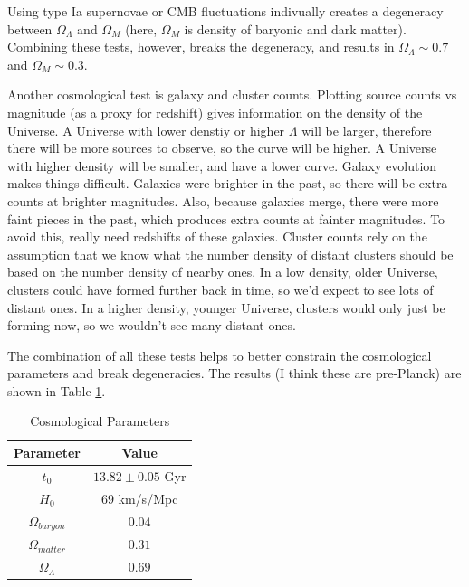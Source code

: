 Using type Ia supernovae or CMB fluctuations indivually creates a degeneracy 
between $\Omega_{\Lambda}$ and $\Omega_M$ (here, $\Omega_M$ is density of 
baryonic and dark matter).  Combining these tests, however, breaks the 
degeneracy, and results in $\Omega_{\Lambda}\sim0.7$ and $\Omega_M\sim0.3$.

Another cosmological test is galaxy and cluster counts.  Plotting 
source counts vs magnitude (as a proxy for redshift) gives information 
on the density of the Universe.  A Universe with lower denstiy or higher 
$\Lambda$ will be larger, therefore there will be more sources to observe, 
so the curve will be higher.  A Universe with higher density will be smaller, 
and have a lower curve.  Galaxy evolution makes things difficult.  Galaxies 
were brighter in the past, so there will be extra counts at brighter 
magnitudes.  Also, because galaxies merge, there were more faint pieces in 
the past, which produces extra counts at fainter magnitudes.  To avoid this, 
really need redshifts of these galaxies.  Cluster counts rely on the 
assumption that we know what the number density of distant clusters should 
be based on the number density of nearby ones.  In a low density, older 
Universe, clusters could have formed further back in time, so we'd expect 
to see lots of distant ones.  In a higher density, younger Universe, clusters 
would only just be forming now, so we wouldn't see many distant ones.  

The combination of all these tests helps to better constrain the cosmological 
parameters and break degeneracies.  The results (I think these are pre-Planck) 
are shown in Table \ref{tab:cosmo}.

\begin{table}[H]
\centering
\begin{tabular}{c c}
\hline\hline
Parameter&Value\\
\hline
$t_0$ & $13.82\pm0.05$ Gyr\\
$H_0$ & $69$ km/s/Mpc\\
$\Omega_{baryon}$ & $0.04$\\
$\Omega_{matter}$ & $0.31$\\
$\Omega_{\Lambda}$ & $0.69$\\
\hline
\end{tabular}
\caption{Cosmological Parameters \label{tab:cosmo}}
\end{table}

